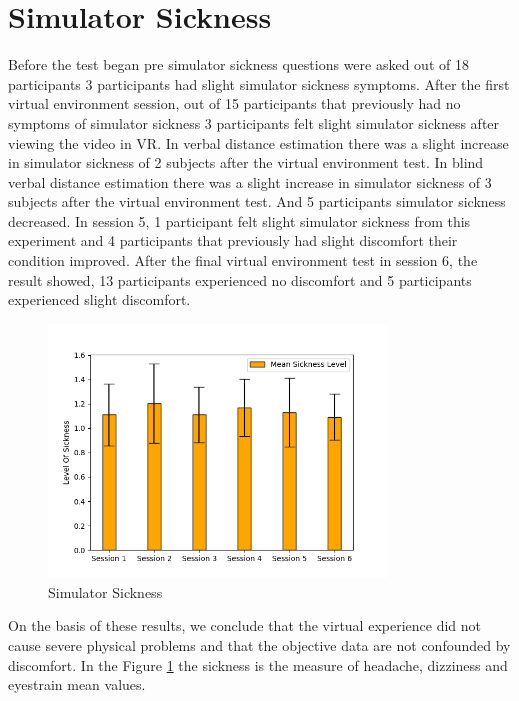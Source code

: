 \section{Simulator Sickness}
Before the test began pre simulator sickness questions were asked out of 18 participants 3 participants had slight simulator sickness symptoms. After the first virtual environment session, out of 15 participants that previously had no symptoms of simulator sickness 3 participants felt slight simulator sickness after viewing the video in VR. In verbal distance estimation there was a slight increase in simulator sickness of 2 subjects after the virtual environment test. In blind verbal distance estimation there was a slight increase in simulator sickness of 3 subjects after the virtual environment test. And 5 participants simulator sickness decreased. In session 5, 1 participant felt slight simulator sickness from this experiment and 4 participants that previously had slight discomfort their condition improved. After the final virtual environment test in session 6, the result showed, 13 participants experienced no discomfort and 5 participants experienced slight discomfort. 
\begin{figure}[h]
    \centering
    \includegraphics[width=0.8\textwidth]{./images/sickness.png}
    \caption{Simulator Sickness}
    \label{fig:sickness}
\end{figure}
On the basis of these results, we conclude that the virtual experience did not cause severe physical problems and that the objective data are not confounded by discomfort. In the Figure \ref{fig:sickness} the sickness is the measure of headache, dizziness and eyestrain mean values.    

